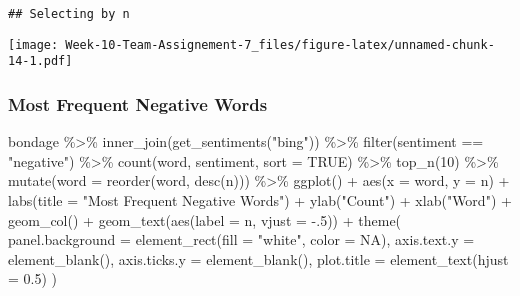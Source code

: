 \documentclass[
]{article}
\newenvironment{Shaded}{\begin{snugshade}}{\end{snugshade}}
\newcommand{\AttributeTok}[1]{\textcolor[rgb]{0.77,0.63,0.00}{#1}}
\newcommand{\ConstantTok}[1]{\textcolor[rgb]{0.00,0.00,0.00}{#1}}
\newcommand{\DecValTok}[1]{\textcolor[rgb]{0.00,0.00,0.81}{#1}}
\newcommand{\FloatTok}[1]{\textcolor[rgb]{0.00,0.00,0.81}{#1}}
\newcommand{\FunctionTok}[1]{\textcolor[rgb]{0.00,0.00,0.00}{#1}}
\newcommand{\NormalTok}[1]{#1}
\newcommand{\SpecialCharTok}[1]{\textcolor[rgb]{0.00,0.00,0.00}{#1}}
\newcommand{\StringTok}[1]{\textcolor[rgb]{0.31,0.60,0.02}{#1}}
\begin{document}
\begin{verbatim}
## Selecting by n
\end{verbatim}

\texttt{[image: Week-10-Team-Assignement-7\_files/figure-latex/unnamed-chunk-14-1.pdf]}

\hypertarget{most-frequent-negative-words}{%
\subsubsection{Most Frequent Negative
Words}\label{most-frequent-negative-words}}

\begin{Shaded}
\begin{Highlighting}[]
\NormalTok{bondage }\SpecialCharTok{\%\textgreater{}\%} 
  \FunctionTok{inner\_join}\NormalTok{(}\FunctionTok{get\_sentiments}\NormalTok{(}\StringTok{"bing"}\NormalTok{)) }\SpecialCharTok{\%\textgreater{}\%} 
  \FunctionTok{filter}\NormalTok{(sentiment }\SpecialCharTok{==} \StringTok{"negative"}\NormalTok{) }\SpecialCharTok{\%\textgreater{}\%}
  \FunctionTok{count}\NormalTok{(word, sentiment, }\AttributeTok{sort =} \ConstantTok{TRUE}\NormalTok{) }\SpecialCharTok{\%\textgreater{}\%} 
  \FunctionTok{top\_n}\NormalTok{(}\DecValTok{10}\NormalTok{) }\SpecialCharTok{\%\textgreater{}\%}
  \FunctionTok{mutate}\NormalTok{(}\AttributeTok{word =} \FunctionTok{reorder}\NormalTok{(word, }\FunctionTok{desc}\NormalTok{(n))) }\SpecialCharTok{\%\textgreater{}\%}
  \FunctionTok{ggplot}\NormalTok{() }\SpecialCharTok{+} 
  \FunctionTok{aes}\NormalTok{(}\AttributeTok{x =}\NormalTok{ word, }\AttributeTok{y =}\NormalTok{ n) }\SpecialCharTok{+}
  \FunctionTok{labs}\NormalTok{(}\AttributeTok{title =} \StringTok{"Most Frequent Negative Words"}\NormalTok{) }\SpecialCharTok{+} 
  \FunctionTok{ylab}\NormalTok{(}\StringTok{"Count"}\NormalTok{) }\SpecialCharTok{+} 
  \FunctionTok{xlab}\NormalTok{(}\StringTok{"Word"}\NormalTok{) }\SpecialCharTok{+}
  \FunctionTok{geom\_col}\NormalTok{() }\SpecialCharTok{+} 
  \FunctionTok{geom\_text}\NormalTok{(}\FunctionTok{aes}\NormalTok{(}\AttributeTok{label =}\NormalTok{ n, }\AttributeTok{vjust =} \SpecialCharTok{{-}}\NormalTok{.}\DecValTok{5}\NormalTok{)) }\SpecialCharTok{+} 
  \FunctionTok{theme}\NormalTok{(}
    \AttributeTok{panel.background =} \FunctionTok{element\_rect}\NormalTok{(}\AttributeTok{fill =} \StringTok{"white"}\NormalTok{, }\AttributeTok{color =} \ConstantTok{NA}\NormalTok{),}
    \AttributeTok{axis.text.y =} \FunctionTok{element\_blank}\NormalTok{(), }
    \AttributeTok{axis.ticks.y =} \FunctionTok{element\_blank}\NormalTok{(),}
    \AttributeTok{plot.title =} \FunctionTok{element\_text}\NormalTok{(}\AttributeTok{hjust =} \FloatTok{0.5}\NormalTok{)}
\NormalTok{  )}
\end{Highlighting}
\end{Shaded}
\end{document}
